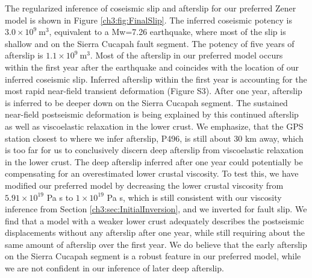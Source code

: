 The regularized inference of coseismic slip and afterslip for our preferred Zener model is shown in Figure \ref{ch3:fig:FinalSlip}.  The inferred coseismic potency is $3.0\times10^{9}\ \mathrm{m}^3$, equivalent to a Mw=7.26 earthquake, where most of the slip is shallow and on the Sierra Cucapah fault segment.  The potency of five years of afterslip is $1.1\times10^{9}\ \mathrm{m}^3$. Most of the afterslip in our preferred model occurs within the first year after the earthquake and coincides with the location of our inferred coseismic slip. Inferred afterslip within the first year is accounting for the most rapid near-field transient deformation (Figure S3).  After one year, afterslip is inferred to be deeper down on the Sierra Cucapah segment.  The sustained near-field postseismic deformation is being explained by this continued afterslip as well as viscoelastic relaxation in the lower crust. We emphasize, that the GPS station closest to where we infer afterslip, P496, is still about 30 km away, which is too far for us to conclusively discern deep afterslip from viscoelastic relaxation in the lower crust.  The deep afterslip inferred after one year could potentially be compensating for an overestimated lower crustal viscosity.  To test this, we have modified our preferred model by decreasing the lower crustal viscosity from $5.91\times10^{19}$ Pa s to $1\times10^{19}$ Pa s, which is still consistent with our viscosity inference from Section \ref{ch3:sec:InitialInversion}, and we inverted for fault slip.  We find that a model with a weaker lower crust adequately describes the postseismic displacements without any afterslip after one year, while still requiring about the same amount of afterslip over the first year. We do believe that the early afterslip on the Sierra Cucapah segment is a robust feature in our preferred model, while we are not confident in our inference of later deep afterslip.                   

